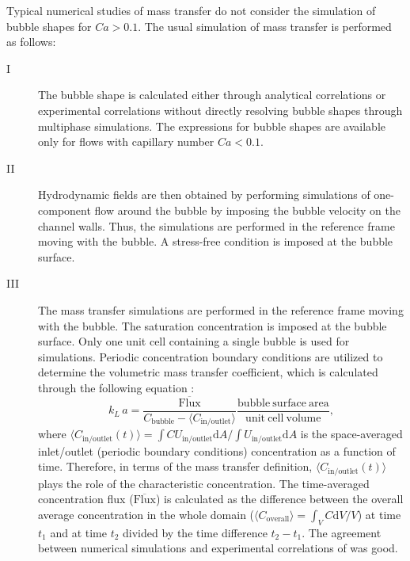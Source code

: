\documentclass[preprint,12pt]{elsarticle}
\newcommand{\vol}{k_L\,a}
\newcommand{\uinoutlet}{U_{\mathrm{in/outlet}}}
\newcommand{\cbubble}{C_{\mathrm{bubble}}}
\newcommand{\cinoutlet}{C_{\mathrm{in/outlet}}}
\newcommand{\coverall}{C_{\mathrm{overall}}}
\begin{document}
Typical numerical studies of mass transfer
\cite{kreutzer-overview,vanbaten-circular} do not consider the simulation of
bubble shapes for $Ca>0.1$. The usual simulation of mass transfer is performed as
follows: 
\begin{description}
 \item[I] The bubble shape is calculated either
through analytical correlations \cite{bretherton} or experimental correlations
\cite{cerro-bubble-train} without directly resolving bubble shapes through
multiphase simulations.  The expressions for bubble shapes are available only
for flows with capillary number $Ca<0.1$.
  \item[II] Hydrodynamic fields
are then obtained by performing simulations of one-component flow around the
bubble by imposing the bubble velocity on the channel walls. Thus, the simulations are
performed in the reference frame moving with the bubble. A stress-free
condition is imposed at the bubble surface.
  \item[III]  The mass transfer
simulations are performed in the reference frame moving with the bubble. The
saturation concentration is imposed at the bubble surface. Only one unit cell
containing a single bubble is used for simulations. Periodic concentration boundary conditions are
utilized to determine the volumetric mass transfer coefficient, which is
calculated through the following equation \cite{vanbaten-circular}:
\begin{equation} \label{main:simulation:equation}
\vol=\frac{\mathrm{\overline{Flux}}}{\cbubble-\langle\cinoutlet\rangle}
\frac{\mathrm{bubble\ surface\ area}}{\mathrm{unit\ cell\ volume}},
\end{equation}
 where $\langle\cinoutlet(t)\rangle=\int{C \uinoutlet
\mathrm{d}A}/\int{\uinoutlet\mathrm{d}A}$ is the space-averaged inlet/outlet (periodic boundary conditions)
concentration as a function of time. Therefore, in terms of the mass transfer definition, $\langle\cinoutlet(t)\rangle$ plays the role of the 
characteristic concentration.
The time-averaged
concentration flux ($\mathrm{\overline{Flux}}$) is calculated as the difference
between the overall average concentration in the whole domain
($\langle\coverall\rangle=\int_{V} C \mathrm{d}V /V$) at time $t_1$ and at time
$t_2$ divided by the time difference $t_2-t_1$. The agreement between numerical
simulations \cite{vanbaten-circular} and experimental correlations of \citet{bercic-mass}
was good. 
 \end{description}
\end{document}
